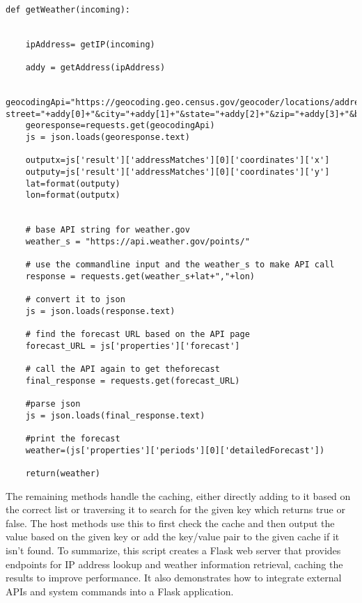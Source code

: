 \begin{lstlisting}[style=mystyle, caption=getWeather method, label=lst:python]

def getWeather(incoming):


    ipAddress= getIP(incoming)
   
    addy = getAddress(ipAddress)

    geocodingApi="https://geocoding.geo.census.gov/geocoder/locations/address?street="+addy[0]+"&city="+addy[1]+"&state="+addy[2]+"&zip="+addy[3]+"&benchmark=Public_AR_Current&format=json"
    georesponse=requests.get(geocodingApi)
    js = json.loads(georesponse.text)
  
    outputx=js['result']['addressMatches'][0]['coordinates']['x']
    outputy=js['result']['addressMatches'][0]['coordinates']['y']
    lat=format(outputy)
    lon=format(outputx)
   
    
    # base API string for weather.gov
    weather_s = "https://api.weather.gov/points/"

    # use the commandline input and the weather_s to make API call
    response = requests.get(weather_s+lat+","+lon)

    # convert it to json
    js = json.loads(response.text)

    # find the forecast URL based on the API page
    forecast_URL = js['properties']['forecast']

    # call the API again to get theforecast
    final_response = requests.get(forecast_URL)

    #parse json
    js = json.loads(final_response.text)

    #print the forecast
    weather=(js['properties']['periods'][0]['detailedForecast'])

    return(weather)
\end{lstlisting}

	The remaining methods handle the caching, either directly adding to it based on the correct list or traversing it to search for the given key which returns true or false. The host methods use this to first check the cache and then output the value based on the given key or add the key/value pair to the given cache if it isn't found. To summarize, this script creates a Flask web server that provides endpoints for IP address lookup and weather information retrieval, caching the results to improve performance. It also demonstrates how to integrate external APIs and system commands into a Flask application.

